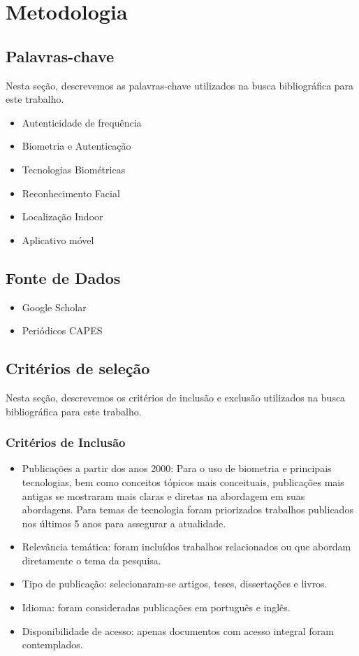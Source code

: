 \chapter{Metodologia}\label{ch:metodologia}


\section{Palavras-chave}\label{sec:palavras-chave}
Nesta seção, descrevemos as palavras-chave utilizados na busca bibliográfica para este trabalho.

\begin{itemize}
    \item Autenticidade de frequência
    \item Biometria e Autenticação
    \item Tecnologias Biométricas
    \item Reconhecimento Facial
    \item Localização Indoor
    \item Aplicativo móvel
\end{itemize}


\section{Fonte de Dados}\label{sec:fonte-dados}
\begin{itemize}
    \item Google Scholar
    \item Periódicos CAPES
\end{itemize}


\section{Critérios de seleção}\label{sec:criterios-de-inclusao}
Nesta seção, descrevemos os critérios de inclusão e exclusão utilizados na busca bibliográfica para este trabalho.

\subsection{Critérios de Inclusão}\label{subsec:criterios-de-inclusao}

\begin{itemize}
    \item Publicações a partir dos anos 2000: Para o uso de biometria e principais tecnologias, bem como conceitos tópicos mais conceituais, publicações mais antigas se mostraram mais claras e diretas na abordagem em suas abordagens.
    Para temas de tecnologia foram priorizados trabalhos publicados nos últimos 5 anos para assegurar a atualidade.
    \item Relevância temática: foram incluídos trabalhos relacionados ou que abordam diretamente o tema da pesquisa.
    \item Tipo de publicação: selecionaram-se artigos, teses, dissertações e livros.
    \item Idioma: foram consideradas publicações em português e inglês.
    \item Disponibilidade de acesso: apenas documentos com acesso integral foram contemplados.
\end{itemize}

